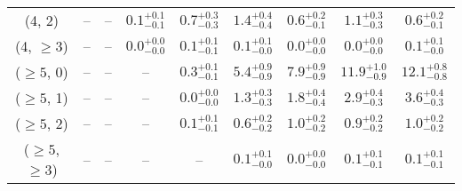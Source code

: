 \begin{table}[h!]
{\begin{tabular}{ccccccccc}
	(4, 2) & -- & -- & $0.1^{+ 0.1 }_{- 0.1 }$ & $0.7^{+ 0.3 }_{- 0.3 }$ & $1.4^{+ 0.4 }_{- 0.4 }$ & $0.6^{+ 0.2 }_{- 0.1 }$ & $1.1^{+ 0.3 }_{- 0.3 }$ & $0.6^{+ 0.2 }_{- 0.1 }$ \\[0.5ex] 
	(4, $\ge3$) & -- & -- & $0.0^{+ 0.0 }_{- 0.0 }$ & $0.1^{+ 0.1 }_{- 0.1 }$ & $0.1^{+ 0.1 }_{- 0.0 }$ & $0.0^{+ 0.0 }_{- 0.0 }$ & $0.0^{+ 0.0 }_{- 0.0 }$ & $0.1^{+ 0.1 }_{- 0.0 }$ \\[0.5ex] 
	($\ge5$, 0) & -- & -- & -- & $0.3^{+ 0.1 }_{- 0.1 }$ & $5.4^{+ 0.9 }_{- 0.9 }$ & $7.9^{+ 0.9 }_{- 0.9 }$ & $11.9^{+ 1.0 }_{- 0.9 }$ & $12.1^{+ 0.8 }_{- 0.8 }$ \\[0.5ex] 
	($\ge5$, 1) & -- & -- & -- & $0.0^{+ 0.0 }_{- 0.0 }$ & $1.3^{+ 0.3 }_{- 0.3 }$ & $1.8^{+ 0.4 }_{- 0.4 }$ & $2.9^{+ 0.4 }_{- 0.3 }$ & $3.6^{+ 0.4 }_{- 0.3 }$ \\[0.5ex] 
	($\ge5$, 2) & -- & -- & -- & $0.1^{+ 0.1 }_{- 0.1 }$ & $0.6^{+ 0.2 }_{- 0.2 }$ & $1.0^{+ 0.2 }_{- 0.2 }$ & $0.9^{+ 0.2 }_{- 0.2 }$ & $1.0^{+ 0.2 }_{- 0.2 }$ \\[0.5ex] 
	($\ge5$, $\ge3$) & -- & -- & -- & -- & $0.1^{+ 0.1 }_{- 0.0 }$ & $0.0^{+ 0.0 }_{- 0.0 }$ & $0.1^{+ 0.1 }_{- 0.1 }$ & $0.1^{+ 0.1 }_{- 0.1 }$ \\[0.5ex] 
	\hline
	\hline
\end{tabular}}
\end{table}
